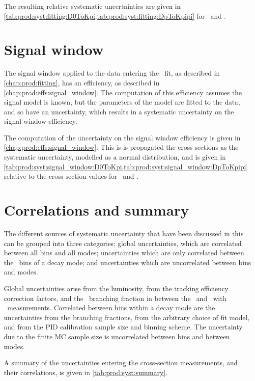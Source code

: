 The resulting relative systematic uncertainties are given in
\cref{tab:prod:syst:fitting:D0ToKpi,tab:prod:syst:fitting:DpToKpipi} for \DzToKpi\ and
\DpToKpipi.

\section{Signal window}
\label{chap:prod:syst:signal_window}

The signal window applied to the data entering the \lnipchisq\ fit, as
described in \cref{chap:prod:fitting}, has an efficiency, as described in
\cref{chap:prod:effs:signal_window}.
The computation of this efficiency assumes the signal model is known, but the
parameters of the model are fitted to the data, and so have an uncertainty,
which results in a systematic uncertainty on the signal window efficiency.

The computation of the uncertainty on the signal window efficiency is given in
\cref{chap:prod:effs:signal_window}.
This is is propagated the cross-sections as the systematic uncertainty,
modelled as a normal distribution, and is given in
\cref{tab:prod:syst:signal_window:D0ToKpi,tab:prod:syst:signal_window:DpToKpipi} relative
to the cross-section values for \DzToKpi\ and \DpToKpipi.

\section{Correlations and summary}
\label{chap:prod:syst:correlations}

The different sources of systematic uncertainty that have been discussed in
this  can be grouped into three categories:
global uncertainties, which are correlated between all bins and all modes;
uncertainties which are only correlated
between the \pTy\ bins of a decay mode; and uncertainties which are
uncorrelated between bins and modes.

Global uncertainties arise from the luminosity, from the tracking efficiency
correction factors, and the \DzToKpi\ branching fraction in between the
\DzToKpi\ and \DstToDzpi\ with \DzToKpi\ measurements.
Correlated between bins within a decay mode are the uncertainties from the
branching fractions, from the arbitrary choice of fit model, and from the
\ac{PID} calibration sample size and binning scheme.
The uncertainty due to the finite \ac{MC} sample size is uncorrelated between
bins and between modes.

A summary of the uncertainties entering the cross-section measurements, and
their correlations, is given in \cref{tab:prod:syst:summary}.

